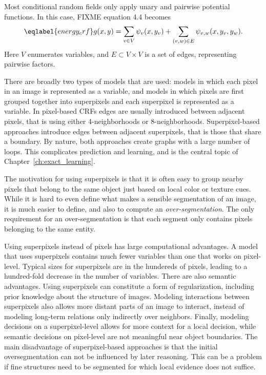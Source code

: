 Most conditional random fields only apply unary and pairwise potential functions. In this case, FIXME equation 4.4
becomes
\begin{equation}\eqlabel{energy_crf}
    g(x, y) = \sum_{v \in V} \psi_v(x, y_v) + \sum_{(v, w) \in E} \psi_{v,w}(x, y_{v}, y_{w}).
\end{equation}
Here $V$ enumerates variables, and $E\subset V \times V$ is a set of edges,
representing pairwise factors.

There are broadly two types of models that are used: models in which each pixel
in an image is represented as a variable, and models in which pixels are first
grouped together into superpixels and each superpixel is represented as a variable.
In pixel-based CRFs edges are usually introduced between adjacent pixels, that is using
either 4-neighborhoods or 8-neighborhoods. Superpixel-based approaches introduce
edges between adjacent superpixels, that is those that share a boundary.
By nature, both approaches create graphs with a large number of loops. This
complicates prediction and learning, and is the central topic of
Chapter~\ref{ch:exact_learning}.

The motivation for using superpixels is that it is often easy to group nearby
pixels that belong to the same object just based on local color or texture cues.
While it is hard to even define what makes a sensible segmentation of an image,
it is much easier to define, and also to compute an \emph{over-segmentation}.
The only requirement for an over-segmentation is that each segment only
contains pixels belonging to the same entity.

Using superpixels instead of pixels has large computational advantages.  A
model that uses superpixels contains much fewer variables than one that works
on pixel-level.  Typical sizes for superpixels are in the hundereds of pixels,
leading to a hundred-fold decrease in the number of variables. There are also
semantic advantages. Using superpixels can constitute a form of regularization,
including prior knowledge about the structure of images. Modeling interactions
between superpixels also allows more distant parts of an image to interact,
instead of modeling long-term relations only indirectly over neighbors.
Finally, modeling decisions on a superpixel-level allows for more context for a
local decision, while semantic decisions on pixel-level are not meaningful near
object boundaries.  The main disadvantage of superpixel-based approaches is
that the initial oversegmentation can not be influenced by later reasoning.
This can be a problem if fine structures need to be segmented for which local
evidence does not suffice.

